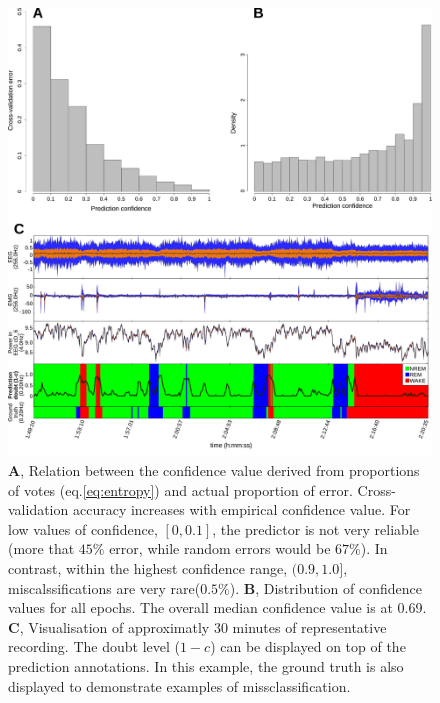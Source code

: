 \begin{figure}[h!]
  \centering    
	\includegraphics[width=1.0\textwidth]{figures/error.pdf}
	\caption{
	\textbf{A}, Relation between the confidence value derived from proportions of votes (eq.\ref{eq:entropy}) and actual proportion of error.
	Cross-validation accuracy increases with empirical confidence value.
	For low values of confidence, $[0, 0.1]$, the predictor is not very reliable (more that $45\%$ error, while random errors would be $67\%$).
	In contrast, within the highest confidence range, $(0.9, 1.0]$, miscalssifications are very rare($0.5 \%$).
	\textbf{B}, Distribution of confidence values for all epochs. The overall median confidence value is at 0.69.
	\textbf{C}, Visualisation of approximatly 30 minutes of representative recording. 
	The doubt level ($1 - c$) can be displayed on top of the prediction annotations.
	In this example, the ground truth is also displayed to demonstrate examples of missclassification.
	\label{fig:error}
  }
\end{figure}

